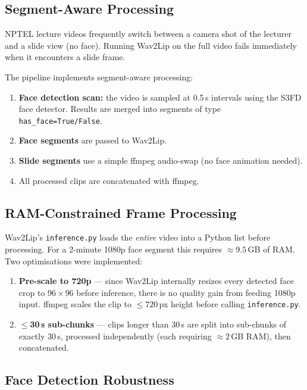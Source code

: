 \documentclass[12pt,a4paper]{article}
\begin{document}
\subsection{Segment-Aware Processing}

NPTEL lecture videos frequently switch between a camera shot of the lecturer
and a slide view (no face).  Running Wav2Lip on the full video fails
immediately when it encounters a slide frame.

The pipeline implements segment-aware processing:

\begin{enumerate}
  \item \textbf{Face detection scan:} the video is sampled at 0.5\,s intervals
        using the S3FD face detector.  Results are merged into segments of type
        \texttt{has\_face=True/False}.
  \item \textbf{Face segments} are passed to Wav2Lip.
  \item \textbf{Slide segments} use a simple ffmpeg audio-swap (no face
        animation needed).
  \item All processed clips are concatenated with ffmpeg.
\end{enumerate}

\subsection{RAM-Constrained Frame Processing}

Wav2Lip's \texttt{inference.py} loads the \emph{entire} video into a Python
list before processing.  For a 2-minute 1080p face segment this requires
$\approx 9.5$\,GB of RAM.  Two optimisations were implemented:

\begin{enumerate}
  \item \textbf{Pre-scale to 720p} — since Wav2Lip internally resizes every
        detected face crop to $96 \times 96$ before inference, there is no
        quality gain from feeding 1080p input.  ffmpeg scales the clip to
        $\leq 720$\,px height before calling \texttt{inference.py}.

  \item \textbf{$\leq$30\,s sub-chunks} --- clips longer than 30\,s are split into
        sub-chunks of exactly 30\,s, processed independently (each requiring
        $\approx 2$\,GB RAM), then concatenated.
\end{enumerate}

\subsection{Face Detection Robustness}
\end{document}

